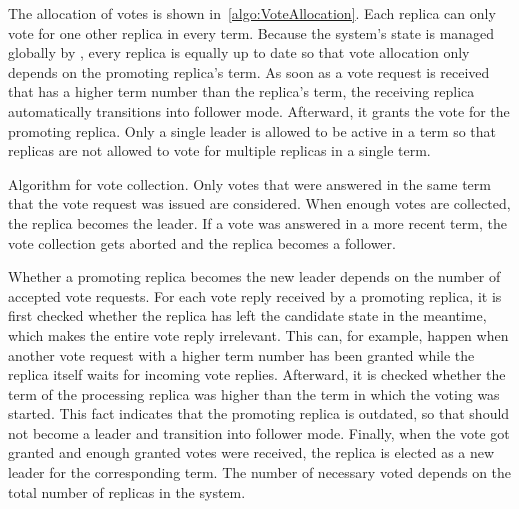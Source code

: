 The allocation of votes is shown in~\autoref{algo:VoteAllocation}.
Each replica can only vote for one other replica in every term.
Because the system's state is managed globally by , every replica is equally up to date so that vote allocation only depends on the promoting replica's term.
As soon as a vote request is received that has a higher term number than the replica's term, the receiving replica automatically transitions into follower mode.
Afterward, it grants the vote for the promoting replica.
Only a single leader is allowed to be active in a term so that replicas are not allowed to vote for multiple replicas in a single term.
\\

\begin{algorithm}[H]\caption{Algorithm for vote collection. Only votes that were answered in the same term that the vote request was issued are considered. When enough votes are collected, the replica becomes the leader. If a vote was answered in a more recent term, the vote collection gets aborted and the replica becomes a follower.}\label{algo:VoteCollection}

\BlankLine

\end{algorithm}

Whether a promoting replica becomes the new leader depends on the number of accepted vote requests.
For each vote reply received by a promoting replica, it is first checked whether the replica has left the candidate state in the meantime, which makes the entire vote reply irrelevant.
This can, for example, happen when another vote request with a higher term number has been granted while the replica itself waits for incoming vote replies.
Afterward, it is checked whether the term of the processing replica was higher than the term in which the voting was started.
This fact indicates that the promoting replica is outdated, so that should not become a leader and transition into follower mode.
Finally, when the vote got granted and enough granted votes were received, the replica is elected as a new leader for the corresponding term.
The number of necessary voted depends on the total number of replicas in the system.

